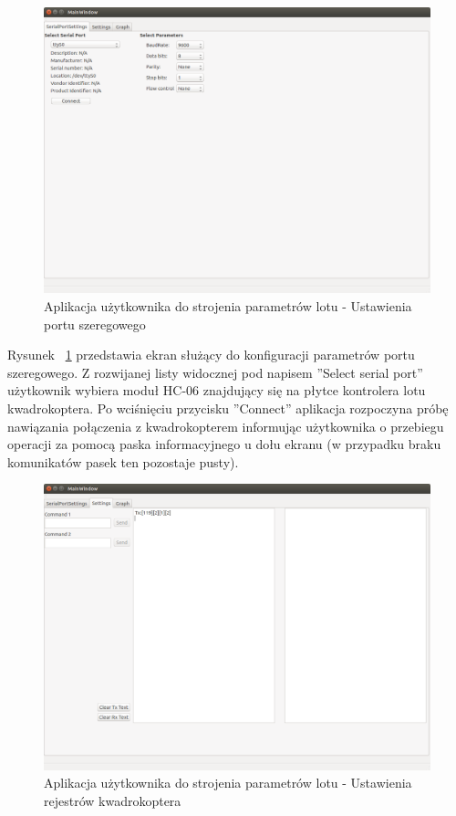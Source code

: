 \begin{figure}[H]
	\centering
	\includegraphics[scale=0.4]{Pictures/QuadroTune/QuadroTuneSerialSettings.png}
	\caption[Aplikacja użytkownika do strojenia parametrów lotu - Ustawienia portu szeregowego]{Aplikacja użytkownika do strojenia parametrów lotu - Ustawienia portu szeregowego}
	\label{fig:QuadroTune_screen1}
\end{figure}

Rysunek ~\ref{fig:QuadroTune_screen1} przedstawia ekran służący do konfiguracji parametrów portu szeregowego. Z rozwijanej listy widocznej pod napisem ''Select serial port'' użytkownik wybiera moduł HC-06 znajdujący się na płytce kontrolera lotu kwadrokoptera. Po wciśnięciu przycisku ''Connect'' aplikacja rozpoczyna próbę nawiązania połączenia z kwadrokopterem informując użytkownika o przebiegu operacji za pomocą paska informacyjnego u dołu ekranu (w przypadku braku komunikatów pasek ten pozostaje pusty).

\begin{figure}[H]
	\centering
	\includegraphics[scale=0.4]{Pictures/QuadroTune/QuadroTuneSettings.png}
	\caption[Aplikacja użytkownika do strojenia parametrów lotu - Ustawienia rejestrów kwadrokoptera]{Aplikacja użytkownika do strojenia parametrów lotu - Ustawienia rejestrów kwadrokoptera}
	\label{fig:QuadroTune_screen2}
\end{figure}

